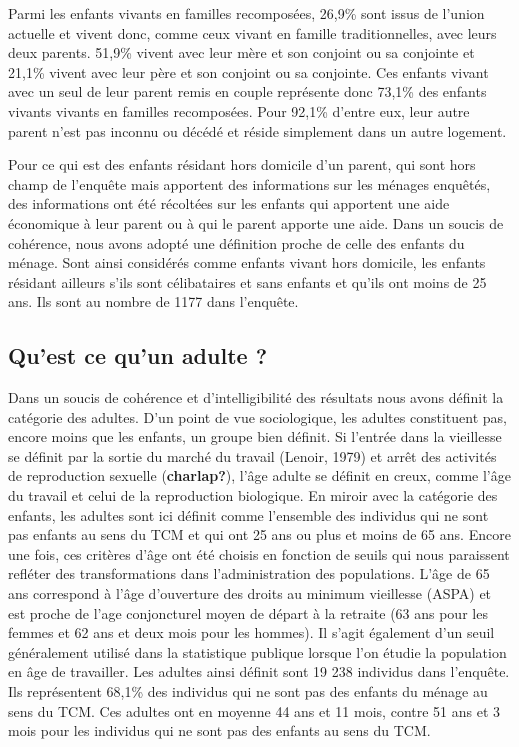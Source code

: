 \documentclass[
  12pt,
]{book}
\begin{document}
Parmi les enfants vivants en familles recomposées, 26,9\% sont issus de
l'union actuelle et vivent donc, comme ceux vivant en famille
traditionnelles, avec leurs deux parents. 51,9\% vivent avec leur mère
et son conjoint ou sa conjointe et 21,1\% vivent avec leur père et son
conjoint ou sa conjointe. Ces enfants vivant avec un seul de leur parent
remis en couple représente donc 73,1\% des enfants vivants vivants en
familles recomposées. Pour 92,1\% d'entre eux, leur autre parent n'est
pas inconnu ou décédé et réside simplement dans un autre logement.

Pour ce qui est des enfants résidant hors domicile d'un parent, qui sont
hors champ de l'enquête mais apportent des informations sur les ménages
enquêtés, des informations ont été récoltées sur les enfants qui
apportent une aide économique à leur parent ou à qui le parent apporte
une aide. Dans un soucis de cohérence, nous avons adopté une définition
proche de celle des enfants du ménage. Sont ainsi considérés comme
enfants vivant hors domicile, les enfants résidant ailleurs s'ils sont
célibataires et sans enfants et qu'ils ont moins de 25 ans. Ils sont au
nombre de 1177 dans l'enquête.

\subsection{Qu'est ce qu'un adulte ?}\label{quest-ce-quun-adulte}

Dans un soucis de cohérence et d'intelligibilité des résultats nous
avons définit la catégorie des adultes. D'un point de vue sociologique,
les adultes constituent pas, encore moins que les enfants, un groupe
bien définit. Si l'entrée dans la vieillesse se définit par la sortie du
marché du travail (Lenoir, 1979) et arrêt des activités de reproduction
sexuelle (\textbf{charlap?}), l'âge adulte se définit en creux, comme
l'âge du travail et celui de la reproduction biologique. En miroir avec
la catégorie des enfants, les adultes sont ici définit comme l'ensemble
des individus qui ne sont pas enfants au sens du TCM et qui ont 25 ans
ou plus et moins de 65 ans. Encore une fois, ces critères d'âge ont été
choisis en fonction de seuils qui nous paraissent refléter des
transformations dans l'administration des populations. L'âge de 65 ans
correspond à l'âge d'ouverture des droits au minimum vieillesse (ASPA)
et est proche de l'age conjoncturel moyen de départ à la retraite (63
ans pour les femmes et 62 ans et deux mois pour les hommes). Il s'agit
également d'un seuil généralement utilisé dans la statistique publique
lorsque l'on étudie la population en âge de travailler. Les adultes
ainsi définit sont 19 238 individus dans l'enquête. Ils représentent
68,1\% des individus qui ne sont pas des enfants du ménage au sens du
TCM. Ces adultes ont en moyenne 44 ans et 11 mois, contre 51 ans et 3
mois pour les individus qui ne sont pas des enfants au sens du TCM.
\end{document}
